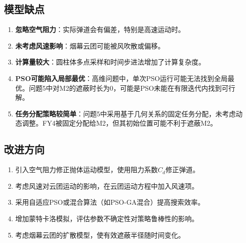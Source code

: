 \documentclass[12pt,a4paper]{article}
\begin{document}
\subsection{模型缺点}

\begin{enumerate}
    \item \textbf{忽略空气阻力}：实际弹道会有偏差，特别是高速运动时。

    \item \textbf{未考虑风速影响}：烟幕云团可能被风吹散或偏移。

    \item \textbf{计算量较大}：圆柱体多点采样和时间步进法增加了计算复杂度。

    \item \textbf{PSO可能陷入局部最优}：高维问题中，单次PSO运行可能无法找到全局最优。问题5中对M2的遮蔽时长为0，可能是PSO未能在有限迭代内找到可行解。

    \item \textbf{任务分配策略较简单}：问题5中采用基于几何关系的固定任务分配，未考虑动态调整。FY4被固定分配给M2，但其初始位置可能不利于遮蔽M2。
\end{enumerate}

\subsection{改进方向}

\begin{enumerate}
    \item 引入空气阻力修正抛体运动模型，使用阻力系数$C_d$修正弹道。

    \item 考虑风速对云团运动的影响，在云团运动方程中加入风速项。

    \item 采用自适应PSO或混合算法（如PSO-GA混合）提高搜索效率。

    \item 增加蒙特卡洛模拟，评估参数不确定性对策略鲁棒性的影响。

    \item 考虑烟幕云团的扩散模型，使有效遮蔽半径随时间变化。
\end{enumerate}
\end{document}
